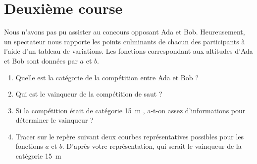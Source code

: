 \documentclass{article}
\begin{document}
\section{Deuxième course}
Nous n'avons pas pu assister au concours opposant Ada et Bob. Heureusement, un spectateur nous rapporte les points culminants de chacun des participants à l'aide d'un tableau de variations. Les fonctions correspondant aux altitudes d'Ada et Bob sont données par $a$ et $b$.
\begin{center}
\end{center}
\begin{enumerate}[resume*]
\item Quelle est la catégorie de la compétition entre Ada et Bob ?
\item Qui est le vainqueur de la compétition de saut ?
\item Si la compétition était de catégorie \og \qty{15}{\m} \fg, a-t-on assez d'informations pour déterminer le vainqueur ?
\item Tracer sur le repère suivant deux courbes représentatives possibles pour les fonctions $a$ et $b$. D'après votre représentation, qui serait le vainqueur de la catégorie \og \qty{15}{\m} \fg 
\end{enumerate}
\begin{center}
\end{center}
\end{document}
